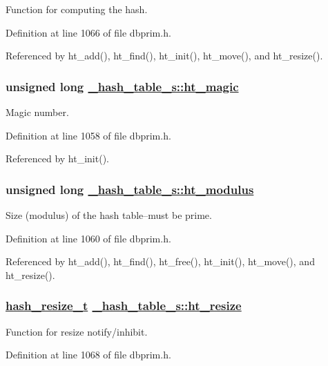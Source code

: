 Function for computing the hash. 

Definition at line 1066 of file dbprim.h.

Referenced by ht\_\-add(), ht\_\-find(), ht\_\-init(), ht\_\-move(), and ht\_\-resize().\hypertarget{struct__hash__table__s_o0}{
\subsubsection[ht\_\-magic]{\setlength{\rightskip}{0pt plus 5cm}unsigned long \hyperlink{struct__hash__table__s_o0}{\_\-hash\_\-table\_\-s::ht\_\-magic}}}
\label{struct__hash__table__s_o0}


Magic number. 

Definition at line 1058 of file dbprim.h.

Referenced by ht\_\-init().\hypertarget{struct__hash__table__s_o2}{
\subsubsection[ht\_\-modulus]{\setlength{\rightskip}{0pt plus 5cm}unsigned long \hyperlink{struct__hash__table__s_o2}{\_\-hash\_\-table\_\-s::ht\_\-modulus}}}
\label{struct__hash__table__s_o2}


Size (modulus) of the hash table--must be prime. 

Definition at line 1060 of file dbprim.h.

Referenced by ht\_\-add(), ht\_\-find(), ht\_\-free(), ht\_\-init(), ht\_\-move(), and ht\_\-resize().\hypertarget{struct__hash__table__s_o9}{
\subsubsection[ht\_\-resize]{\setlength{\rightskip}{0pt plus 5cm}\hyperlink{group__dbprim__hash_ga6}{hash\_\-resize\_\-t} \hyperlink{struct__hash__table__s_o9}{\_\-hash\_\-table\_\-s::ht\_\-resize}}}
\label{struct__hash__table__s_o9}


Function for resize notify/inhibit. 

Definition at line 1068 of file dbprim.h.

